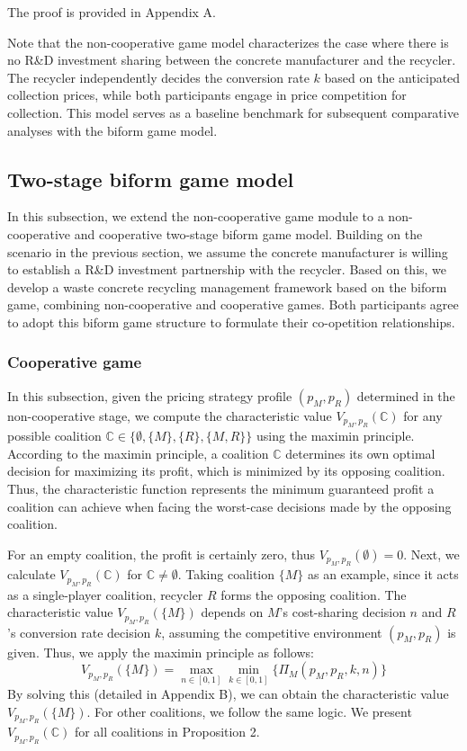 \documentclass[authoryear,preprint,review,times,10pt]{elsarticle}
\begin{document}
 The proof is provided in Appendix A.

Note that the non-cooperative game model characterizes the case where there is no R\&D investment sharing between the concrete manufacturer and the recycler. The recycler independently decides the conversion rate $k$ based on the anticipated collection prices, while both participants engage in price competition for collection. This model serves as a baseline benchmark for subsequent comparative analyses with the biform game model.

\subsection{Two-stage biform game model}
\label{sec:biform_model}
In this subsection, we extend the non-cooperative game module to a non-cooperative and cooperative two-stage biform game model. Building on the scenario in the previous section, we assume the concrete manufacturer is willing to establish a R\&D investment partnership with the recycler. Based on this, we develop a waste concrete recycling management framework based on the biform game, combining non-cooperative and cooperative games. Both participants agree to adopt this biform game structure to formulate their co-opetition relationships.

\subsubsection{Cooperative game}
\label{sec:cooperative_game}

In this subsection, given the pricing strategy profile $(p_M, p_R)$ determined in the non-cooperative stage, we compute the characteristic value $V_{p_M,p_R}(\mathbb{C})$ for any possible coalition $\mathbb{C} \in \{\emptyset, \{M\}, \{R\}, \{M,R\}\}$ using the maximin principle. According to the maximin principle, a coalition $\mathbb{C}$ determines its own optimal decision for maximizing its profit, which is minimized by its opposing coalition. Thus, the characteristic function represents the minimum guaranteed profit a coalition can achieve when facing the worst-case decisions made by the opposing coalition.

For an empty coalition, the profit is certainly zero, thus $V_{p_M,p_R}(\emptyset) = 0$. Next, we calculate $V_{p_M,p_R}(\mathbb{C})$ for $\mathbb{C} \neq \emptyset$. Taking coalition $\{M\}$ as an example, since it acts as a single-player coalition, recycler $R$ forms the opposing coalition. The characteristic value $V_{p_M,p_R}(\{M\})$ depends on $M$'s cost-sharing decision $n$ and $R$'s conversion rate decision $k$, assuming the competitive environment $(p_M, p_R)$ is given. Thus, we apply the maximin principle as follows:
\begin{equation}
V_{p_M,p_R}(\{M\}) = \max_{n \in [0,1]} \min_{k \in [0,1]} \{\Pi_M(p_M, p_R, k, n)\}
\end{equation}
By solving this (detailed in Appendix B), we can obtain the characteristic value $V_{p_M,p_R}(\{M\})$. For other coalitions, we follow the same logic. We present $V_{p_M,p_R}(\mathbb{C})$ for all coalitions in Proposition 2.
\end{document}
